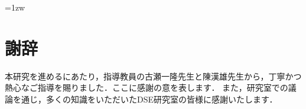 \documentclass[a4paper,11pt]{ujreport}
\begin{document}
\maketitle
\thispagestyle{empty}
\newpage

\thispagestyle{empty}
\vspace*{20pt plus 1fil}
\parindent=1zw
\noindent


\par
\vspace{0pt plus 1fil}
\newpage

\tableofcontents
\listoffigures
\listoftables

\pagebreak \setcounter{page}{1}


\chapter*{謝辞}
本研究を進めるにあたり，指導教員の古瀬一隆先生と陳漢雄先生から，丁寧かつ熱心なご指導を賜りました．ここに感謝の意を表します．
また，研究室での議論を通じ，多くの知識をいただいたDSE研究室の皆様に感謝いたします．

\newpage

\renewcommand{\bibname}{参考文献}



\end{document}
